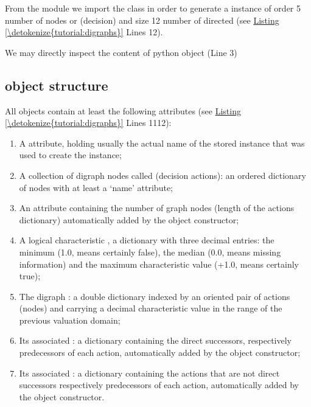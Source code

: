 \documentclass[a4paper,12pt,english]{sphinxhowto}
\begin{document}
From the  module we import the  class in order to  generate a  instance of order 5 \sphinxhyphen{} number of nodes or (decision)  \sphinxhyphen{} and size 12 \sphinxhyphen{} number of directed  (see \hyperref[\detokenize{tutorial:digraphs}]{Listing \ref{\detokenize{tutorial:digraphs}}} Lines 1\sphinxhyphen{}2).

We may directly inspect the content of  python object  (Line 3)


\subsection{ object structure}
\label{\detokenize{tutorial:digraph-object-structure}}
All  objects contain at least the following attributes (see \hyperref[\detokenize{tutorial:digraphs}]{Listing \ref{\detokenize{tutorial:digraphs}}} Lines 11\sphinxhyphen{}12):
\begin{enumerate}
%
\setcounter{enumi}{-1}
\item {} 
A  attribute, holding usually the actual name of the stored instance that was used to create the instance;

\item {} 
A collection of digraph nodes called  (decision actions): an ordered dictionary of nodes with at least a ‘name’ attribute;

\item {} 
An  attribute containing the number of graph nodes (length of the actions dictionary) automatically added by the object constructor;

\item {} 
A logical characteristic , a dictionary with three decimal entries: the minimum (\sphinxhyphen{}1.0, means certainly false), the median (0.0, means missing information) and the maximum characteristic value (+1.0, means certainly true);

\item {} 
The digraph  : a double dictionary indexed by an oriented pair of actions (nodes) and carrying a decimal characteristic value in the range of the previous valuation domain;

\item {} 
Its associated  : a dictionary containing the direct successors, respectively predecessors of each action, automatically added by the object constructor;

\item {} 
Its associated  : a dictionary containing the actions that are not direct successors respectively predecessors of each action, automatically added by the object constructor.

\end{enumerate}
\end{document}

